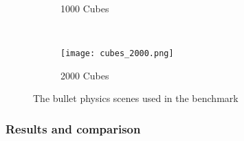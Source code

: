 \begin{figure}
\begin{subfigure}[b]{0.45\textwidth}
                \caption{1000 Cubes}
                \label{fig:cubes_1000}
        \end{subfigure}
        ~ %
        \begin{subfigure}[b]{0.45\textwidth}
                \texttt{[image: cubes\_2000.png]}
                \caption{2000 Cubes}
                \label{fig:cubes_2000}
        \end{subfigure}
        \caption{The bullet physics scenes used in the benchmark}\label{fig:bullet_screenshots}
\end{figure}



\subsubsection{Results and comparison} %
\label{ssub:results_bullet_physics_performance}

